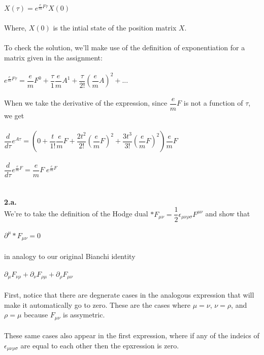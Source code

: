 \documentclass[prb,preprint]
{revtex4-1}
\newcommand{\PRLsep}{\noindent\makebox[\linewidth]{\resizebox{0.8888\linewidth}{2pt}{$\bullet$}}\bigskip}
\begin{document}
\\
\\
$X\left(\tau\right) = e^{\frac{e}{m}F\tau}X\left(0\right)$
\\
\\
Where, $X\left(0\right)$ is the intial state of the position matrix $X$.  
\\
\\
To check the solution, we'll make use of the definition of exponentiation for a matrix given in the assignment:
\\
\\
$e^{\frac{e}{m}F\tau} = \dfrac{e}{m}F^0 + \dfrac{\tau}{1}\dfrac{e}{m}A^1 + \dfrac{\tau}{2!}\left(\dfrac{e}{m}A\right)^2 + ...$
\\
\\
When we take the derivative of the expression, since $\dfrac{e}{m}F$ is not a function of $\tau$, we get
\\
\\
$\dfrac{d}{d\tau} e^{A\tau} = \left(0 + \dfrac{t}{1!}\dfrac{e}{m}F + \dfrac{2t^2}{2!}\left(\dfrac{e}{m}F\right)^2 + \dfrac{3t^3}{3!}\left(\dfrac{e}{m}F\right)^2\right)\dfrac{e}{m}F$
\\
\\
$\dfrac{d}{d\tau} e^{\frac{e}{m}F} = \dfrac{e}{m}F\;e^{\frac{e}{m}F}$ 
\\
\\
\PRLsep
\\
\newpage
\textbf{2.a.}
\\
We're to take the definition of the Hodge dual
$*F_{\mu\nu} = \dfrac{1}{2}\epsilon_{\mu\nu\rho\sigma}F^{\mu\nu}$ and show that
\\
\\
$\partial^\mu *F_{\mu\nu} = 0$
\\
\\
in analogy to our original Bianchi identity
\\
\\
$\partial_\mu F_{\nu\rho} + \partial_\nu F_{\rho\mu} + \partial_\rho F_{\mu\nu}$
\\
\\
First, notice that there are degnerate cases in the analogous expression that will make it automatically go to zero.  These are the cases where $\mu = \nu$, $\nu = \rho$, and $\rho = \mu$ because $F_{\mu\nu}$ is assymetric.
\\
\\
These same cases also appear in the first expression, where if any of the indeics of $\epsilon_{\mu\nu\rho\sigma}$ are equal to each other then the epxression is zero.
\end{document}
